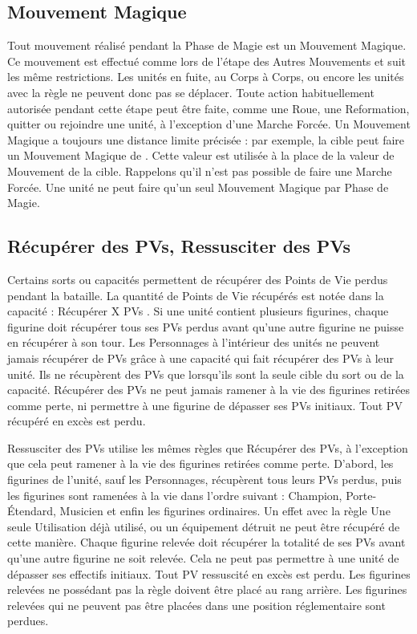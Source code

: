 \hypertarget{magicalmove}{\subsection{Mouvement Magique}}
\label{magicalmove}

Tout mouvement réalisé pendant la Phase de Magie est un Mouvement Magique. Ce mouvement est effectué comme lors de l'étape des Autres Mouvements et suit les même restrictions. Les unités en fuite, au Corps à Corps, ou encore les unités avec la règle \randommovement{} ne peuvent donc pas se déplacer. Toute action habituellement autorisée pendant cette étape peut être faite, comme une Roue, une Reformation, quitter ou rejoindre une unité, à l'exception d'une Marche Forcée. Un Mouvement Magique a toujours une distance limite précisée : par exemple, \og la cible peut faire un Mouvement Magique de  \fg{}. Cette valeur est utilisée à la place de la valeur de Mouvement de la cible. Rappelons qu'il n'est pas possible de faire une Marche Forcée. Une unité ne peut faire qu'un seul Mouvement Magique par Phase de Magie.

\hypertarget{recoverandraisewounds}{\subsection{Récupérer des PVs, Ressusciter des PVs}}
\label{recoverandraisewounds}

Certains sorts ou capacités permettent de récupérer des Points de Vie perdus pendant la bataille. La quantité de Points de Vie récupérés est notée dans la capacité  : \og Récupérer X PVs \fg{}. Si une unité contient plusieurs figurines, chaque figurine doit récupérer tous ses PVs perdus avant qu'une autre figurine ne puisse en récupérer à son tour. Les Personnages à l'intérieur des unités ne peuvent jamais récupérer de PVs grâce à une capacité qui fait récupérer des PVs à leur unité. Ils ne récupèrent des PVs que lorsqu'ils sont la seule cible du sort ou de la capacité. Récupérer des PVs ne peut jamais ramener à la vie des figurines retirées comme perte, ni permettre à une figurine de dépasser ses PVs initiaux. Tout PV récupéré en excès est perdu.

Ressusciter des PVs utilise les mêmes règles que Récupérer des PVs, à l'exception que cela peut ramener à la vie des figurines retirées comme perte. D'abord, les figurines de l'unité, sauf les Personnages, récupèrent tous leurs PVs perdus, puis les figurines sont ramenées à la vie dans l'ordre suivant : Champion, Porte-Étendard, Musicien et enfin les figurines ordinaires. Un effet avec la règle Une seule Utilisation déjà utilisé, ou un équipement détruit ne peut être récupéré de cette manière. Chaque figurine relevée doit récupérer la totalité de ses PVs avant qu'une autre figurine ne soit relevée. Cela ne peut pas permettre à une unité de dépasser ses effectifs initiaux. Tout PV ressuscité en excès est perdu. Les figurines relevées ne possédant pas la règle \frontrank{} doivent être placé au rang arrière. Les figurines relevées qui ne peuvent pas être placées dans une position réglementaire sont perdues.

